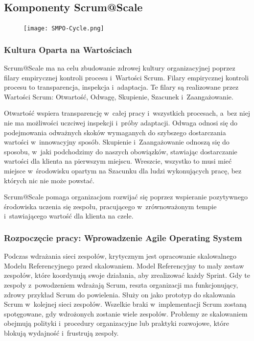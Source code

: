 \documentclass[12pt,a4paper,parskip=full]{scrartcl}
\begin{document}
\subsection{Komponenty Scrum@Scale}\label{the-components-of-scrumatscale}
\begin{figure}[H]
    \centering
    \texttt{[image: SMPO-Cycle.png]}
\end{figure}

\subsubsection{Kultura Oparta na Wartościach}\label{values-driven-culture}

Scrum@Scale ma na celu zbudowanie zdrowej kultury organizacyjnej poprzez filary empirycznej kontroli procesu i~Wartości Scrum. Filary empirycznej kontroli procesu to transparencja, inspekcja i~adaptacja. Te filary są realizowane przez Wartości Scrum: Otwartość, Odwagę, Skupienie, Szacunek i~Zaangażowanie.

Otwartość wspiera transparencję w~całej pracy i~wszystkich procesach, a~bez niej nie ma możliwości uczciwej inspekcji i~próby adaptacji. Odwaga odnosi się do podejmowania odważnych skoków wymaganych do szybszego dostarczania wartości w~innowacyjny sposób. Skupienie i~Zaangażowanie odnoszą się do sposobu, w~jaki podchodzimy do naszych obowiązków, stawiając dostarczanie wartości dla klienta na pierwszym miejscu. Wreszcie, wszystko to musi mieć miejsce w~środowisku opartym na Szacunku dla ludzi wykonujących pracę, bez których nic nie może powstać.

Scrum@Scale pomaga organizacjom rozwijać się poprzez wspieranie pozytywnego środowiska uczenia się zespołu, pracującego w~zrównoważonym tempie i~stawiającego wartość dla klienta na czele.

\subsubsection{Rozpoczęcie pracy: Wprowadzenie Agile Operating
System}\label{getting-started-installing-an-agile-operating-system}

Podczas wdrażania sieci zespołów, krytycznym jest opracowanie skalowalnego Modelu Referencyjnego przed skalowaniem. Model Referencyjny to mały zestaw zespołów, które koordynują swoje działania, aby zrealizować każdy Sprint. Gdy te zespoły z~powodzeniem wdrażają Scrum, reszta organizacji ma funkcjonujący, zdrowy przykład Scrum do powielenia. Służy on jako prototyp do skalowania Scrum w~kolejnej sieci zespołów. Wszelkie braki w~implementacji Scrum zostaną spotęgowane, gdy wdrożonych zostanie wiele zespołów. Problemy ze skalowaniem obejmują polityki i~procedury organizacyjne lub praktyki rozwojowe, które blokują wydajność i~frustrują zespoły.
\end{document}
